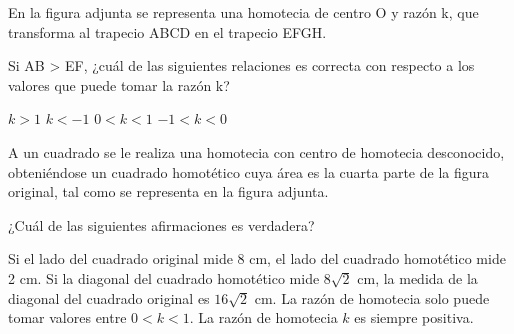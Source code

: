 \documentclass[sin nombre]{srs}
\begin{document}
\begin{preguntas}[after-item-skip=1cm]
\pregunta En la figura adjunta se representa una homotecia de centro O y razón k, que transforma al trapecio ABCD en el trapecio EFGH.
\begin{centrado}
\vspace*{3ex}
\vspace*{3ex}
\end{centrado}
Si AB > EF, ¿cuál de las siguientes relaciones es correcta con respecto a los valores que puede tomar la razón k?
\begin{vertical}
\alternativa $k > 1$
\alternativa $k < -1$
\alternativa $0 < k < 1$
\alternativa $-1 < k < 0$
\end{vertical}

\pregunta A un cuadrado se le realiza una homotecia con centro de homotecia desconocido, obteniéndose un cuadrado homotético cuya área es la cuarta parte de la figura original, tal como se representa en la figura adjunta.
\begin{centrado}
\end{centrado}
¿Cuál de las siguientes afirmaciones es verdadera?
\begin{vertical}
\alternativa Si el lado del cuadrado original mide 8 cm, el lado del cuadrado homotético mide 2 cm.
\alternativa Si la diagonal del cuadrado homotético mide $8\sqrt{2}$ cm, la medida de la diagonal del cuadrado original es $16\sqrt{2}$ cm.
\alternativa La razón de homotecia solo puede tomar valores entre $0 < k < 1$.
\alternativa La razón de homotecia $k$ es siempre positiva.
\end{vertical}


\end{preguntas}
\end{document}
